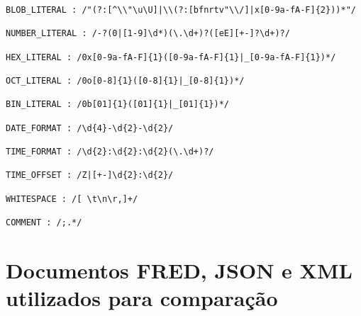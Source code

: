 \begin{apendicesenv}
\begin{lstlisting}[caption=Gramática em notação LARK para linguagem FRED,label={lst:fredgrammar}]
BLOB_LITERAL : /"(?:[^\\"\u\U]|\\(?:[bfnrtv"\\/]|x[0-9a-fA-F]{2}))*"/

NUMBER_LITERAL : /-?(0|[1-9]\d*)(\.\d+)?([eE][+-]?\d+)?/

HEX_LITERAL : /0x[0-9a-fA-F]{1}([0-9a-fA-F]{1}|_[0-9a-fA-F]{1})*/

OCT_LITERAL : /0o[0-8]{1}([0-8]{1}|_[0-8]{1})*/

BIN_LITERAL : /0b[01]{1}([01]{1}|_[01]{1})*/

DATE_FORMAT : /\d{4}-\d{2}-\d{2}/

TIME_FORMAT : /\d{2}:\d{2}:\d{2}(\.\d+)?/

TIME_OFFSET : /Z|[+-]\d{2}:\d{2}/

WHITESPACE : /[ \t\n\r,]+/

COMMENT : /;.*/
\end{lstlisting}

\chapter{Documentos FRED, JSON e XML utilizados para comparação}
\label{sec:docsexamples}



















\end{apendicesenv}
